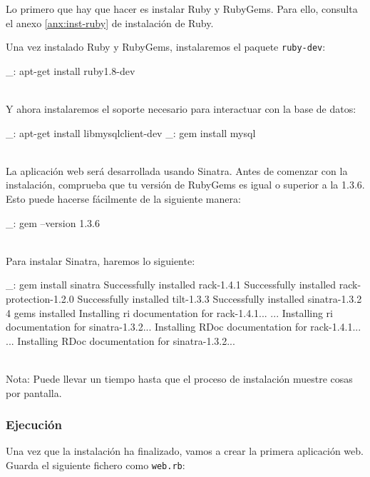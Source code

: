 Lo primero que hay que hacer es instalar Ruby y RubyGems. Para ello, consulta el anexo \ref{anx:inst-ruby} de instalación de Ruby.

Una vez instalado Ruby y RubyGems, instalaremos el paquete \texttt{ruby-dev}:

\begin{bashcode}
_: apt-get install ruby1.8-dev
\end{bashcode}
\\

Y ahora instalaremos el soporte necesario para interactuar con la base de datos:

\begin{bashcode}
_: apt-get install libmysqlclient-dev
_: gem install mysql
\end{bashcode}
\\

La aplicación web será desarrollada usando Sinatra. Antes de comenzar con la instalación, comprueba que tu versión de RubyGems es igual o superior a la 1.3.6. Esto puede hacerse fácilmente de la siguiente manera:

\begin{bashcode}
_: gem --version
1.3.6
\end{bashcode}
\\

Para instalar Sinatra, haremos lo siguiente:

\begin{bashcode}
_: gem install sinatra
Successfully installed rack-1.4.1
Successfully installed rack-protection-1.2.0
Successfully installed tilt-1.3.3
Successfully installed sinatra-1.3.2
4 gems installed
Installing ri documentation for rack-1.4.1...
...
Installing ri documentation for sinatra-1.3.2...
Installing RDoc documentation for rack-1.4.1...
...
Installing RDoc documentation for sinatra-1.3.2...
\end{bashcode}
\\

Nota: Puede llevar un tiempo hasta que el proceso de instalación muestre cosas por pantalla.


\subsubsection{Ejecución}

Una vez que la instalación ha finalizado, vamos a crear la primera aplicación web. Guarda el siguiente fichero como \texttt{web.rb}:

